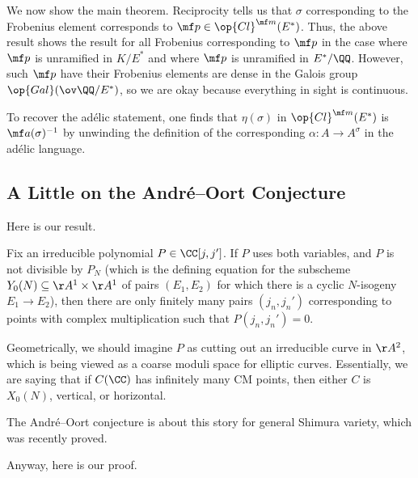 \documentclass[../notes.tex]{subfiles}
\begin{document}
We now show the main theorem. Reciprocity tells us that $\sigma$ corresponding to the Frobenius element corresponds to $\mf p\in\op{Cl}^{\mf m}(E^*)$. Thus, the above result shows the result for all Frobenius corresponding to $\mf p$ in the case where $\mf p$ is unramified in $K/E^*$ and where $\mf p$ is unramified in $E^*/\QQ$. However, such $\mf p$ have their Frobenius elements are dense in the Galois group $\op{Gal}(\ov\QQ/E^*)$, so we are okay because everything in sight is continuous.
\begin{remark}
	To recover the ad\'elic statement, one finds that $\eta(\sigma)$ in $\op{Cl}^{\mf m}(E^*)$ is $\mf a(\sigma)^{-1}$ by unwinding the definition of the corresponding $\alpha\colon A\to A^\sigma$ in the ad\'elic language.
\end{remark}

\subsection{A Little on the Andr\'e--Oort Conjecture}
Here is our result.
\begin{theorem}
	Fix an irreducible polynomial $P\in\CC[j,j']$. If $P$ uses both variables, and $P$ is not divisible by $P_N$ (which is the defining equation for the subscheme $Y_0(N)\subseteq\AA^1\times\AA^1$ of pairs $(E_1,E_2)$ for which there is a cyclic $N$-isogeny $E_1\to E_2$), then there are only finitely many pairs $(j_n,j_n')$ corresponding to points with complex multiplication such that $P(j_n,j_n')=0$.
\end{theorem}
Geometrically, we should imagine $P$ as cutting out an irreducible curve in $\AA^2$, which is being viewed as a coarse moduli space for elliptic curves. Essentially, we are saying that if $C(\CC)$ has infinitely many CM points, then either $C$ is $X_0(N)$, vertical, or horizontal.
\begin{remark}
	The Andr\'e--Oort conjecture is about this story for general Shimura variety, which was recently proved.
\end{remark}
Anyway, here is our proof.
\end{document}
